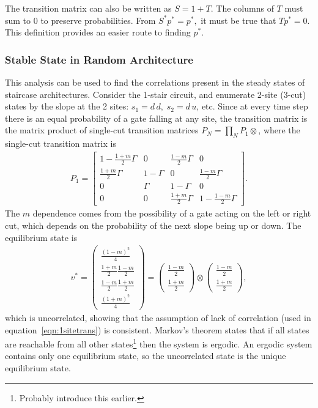 The transition matrix can also be written as $S = 1+T$. The columns of $T$ must sum to 0 to preserve probabilities. From $S^*p^* = p^*,$ it must be true that $Tp^*=0$. This definition provides an easier route to finding $p^*$.

\subsubsection{Stable State in Random Architecture}  \label{subsub:randstate}

This analysis can be used to find the correlations present in the steady states of staircase architectures. Consider the 1-stair circuit, and enumerate 2-site (3-cut) states by the slope at the 2 sites: $s_1 = d\,d,\; s_2 = d\,u$, etc. Since at every time step there is an equal probability of a gate falling at any site, the transition matrix is the matrix product of single-cut transition matrices $P_{N} = \prod_NP_{1}\otimes$, where the single-cut transition matrix is 
\begin{align}
P_1 = \begin{bmatrix}
1-\frac{1+m}{2}\Gamma & 0      & \frac{1-m}{2}\Gamma & 0\\
\frac{1+m}{2}\Gamma & 1-\Gamma & 0                   & \frac{1-m}{2}\Gamma\\
0                   & \Gamma   & 1-\Gamma            & 0\\
0                   & 0        & \frac{1+m}{2}\Gamma & 1 - \frac{1-m}{2}\Gamma
\end{bmatrix}. \label{eqn:1sitetrans}
\end{align}
The $m$ dependence comes from the possibility of a gate acting on the left or right cut, which depends on the probability of the next slope being up or down.
The equilibrium state is
\begin{align}
v^* = \begin{pmatrix}
\frac{(1-m)^2}{4} \\ 
\frac{1+m}{2}\frac{1-m}{2} \\
\frac{1-m}{2}\frac{1+m}{2} \\
\frac{(1+m)^2}{4}
\end{pmatrix} = \begin{pmatrix}
\frac{1-m}{2} \\ \frac{1+m}{2}
\end{pmatrix} \otimes \begin{pmatrix}
\frac{1-m}{2} \\ \frac{1+m}{2}
\end{pmatrix},
\end{align}
which is uncorrelated, showing that the assumption of lack of correlation (used in equation~\ref{eqn:1sitetrans}) is consistent. Markov's theorem states that if all states are reachable from all other states\footnote{Probably introduce this earlier.} then the system is ergodic. An ergodic system contains only one equilibrium state, so the uncorrelated state is the unique equilibrium state.

